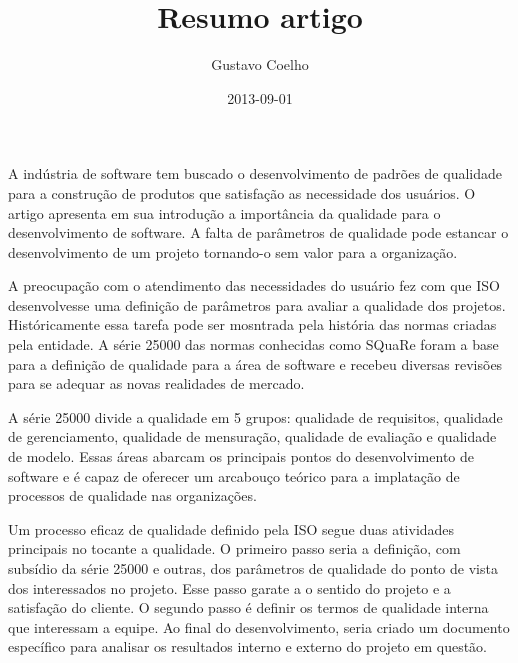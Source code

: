 \documentclass{article}
\title{Resumo artigo}
\date{2013-09-01}
\author{Gustavo Coelho}
\begin{document}



\newpage
A indústria de software tem buscado o desenvolvimento de padrões de qualidade para a construção de 
produtos que satisfação as necessidade dos usuários. O artigo apresenta em sua introdução a importância
da qualidade para o desenvolvimento de software. A falta de parâmetros de qualidade pode estancar o 
desenvolvimento de um projeto tornando-o sem valor para a organização. 

A preocupação com o atendimento das necessidades do usuário fez com que ISO desenvolvesse  uma definição
de parâmetros para avaliar a qualidade dos projetos. Históricamente essa tarefa pode ser mosntrada
pela história das normas criadas pela entidade. A série 25000 das normas conhecidas como SQuaRe foram 
a base para a definição de qualidade para a área de software e recebeu diversas revisões para se
adequar as novas realidades de mercado.

A série 25000 divide a qualidade em 5 grupos: qualidade de requisitos, qualidade de gerenciamento,
qualidade de mensuração, qualidade de evaliação e qualidade de modelo. Essas áreas abarcam os principais
pontos do desenvolvimento de software e é capaz de oferecer um arcabouço teórico para a implatação de 
processos de qualidade nas organizações.

Um processo eficaz de qualidade definido pela ISO segue duas atividades principais no tocante a qualidade.
O primeiro passo seria a definição, com subsídio da série 25000 e outras, dos parâmetros de qualidade do 
ponto de vista dos interessados no projeto. Esse passo garate a o sentido do projeto e a satisfação do cliente.
O segundo passo é definir os termos de qualidade interna que interessam a equipe. Ao final do desenvolvimento,
seria criado um documento específico para analisar os resultados interno e externo do projeto em questão.
\end{document}
